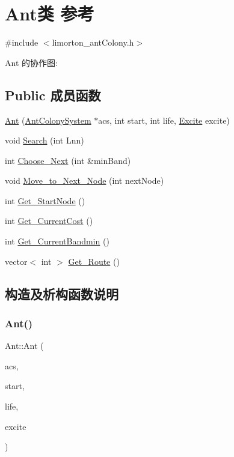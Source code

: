 \hypertarget{class_ant}{}\section{Ant类 参考}
\label{class_ant}


{\ttfamily \#include $<$limorton\+\_\+ant\+Colony.\+h$>$}



Ant 的协作图\+:
\subsection*{Public 成员函数}
\begin{DoxyCompactItemize}
\item 
\hyperlink{class_ant_a9e0650e2ef29724da8f8f8a041e87928}{Ant} (\hyperlink{class_ant_colony_system}{Ant\+Colony\+System} $\ast$acs, int start, int life, \hyperlink{limorton__ant_colony_8h_a6557ba74979e13748c8317df32f24d3a}{Excite} excite)
\item 
void \hyperlink{class_ant_a723d84c7f27f716b6632108e196ed513}{Search} (int Lnn)
\item 
int \hyperlink{class_ant_a44da4dbcbab045b0a226c54e1a8ae391}{Choose\+\_\+\+Next} (int \&min\+Band)
\item 
void \hyperlink{class_ant_af520d2c85aa44726d7ded378b97eab9b}{Move\+\_\+to\+\_\+\+Next\+\_\+\+Node} (int next\+Node)
\item 
int \hyperlink{class_ant_a6b39f50c57698a6ee11324d125c5e6cb}{Get\+\_\+\+Start\+Node} ()
\item 
int \hyperlink{class_ant_a546f01cf456bf3c47112658c31d53758}{Get\+\_\+\+Current\+Cost} ()
\item 
int \hyperlink{class_ant_aa3accfa6372b99983560c9dc4fde69ab}{Get\+\_\+\+Current\+Bandmin} ()
\item 
vector$<$ int $>$ \hyperlink{class_ant_a5f6ea0abcb484f61b867b577b5deb7ce}{Get\+\_\+\+Route} ()
\end{DoxyCompactItemize}


\subsection{构造及析构函数说明}
\mbox{\label{class_ant_a9e0650e2ef29724da8f8f8a041e87928}} 
\subsubsection{\texorpdfstring{Ant()}{Ant()}}
{\footnotesize\ttfamily Ant\+::\+Ant (\begin{DoxyParamCaption}\item[{\hyperlink{class_ant_colony_system}{Ant\+Colony\+System} $\ast$}]{acs,  }\item[{int}]{start,  }\item[{int}]{life,  }\item[{\hyperlink{limorton__ant_colony_8h_a6557ba74979e13748c8317df32f24d3a}{Excite}}]{excite }\end{DoxyParamCaption})}



